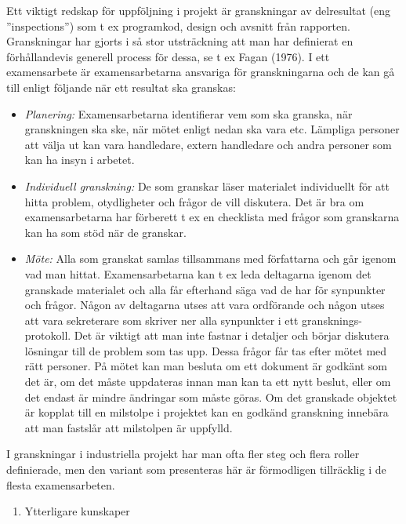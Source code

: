 Ett viktigt redskap för uppföljning i projekt är granskningar av
delresultat (eng ''inspections'') som t ex programkod, design och
avsnitt från rapporten. Granskningar har gjorts i så stor utsträckning
att man har definierat en förhållandevis generell process för dessa, se
t ex Fagan (1976). I ett examensarbete är examensarbetarna ansvariga för
granskningarna och de kan gå till enligt följande när ett resultat ska
granskas:

\begin{itemize}
\item
  \emph{Planering:} Examensarbetarna identifierar vem som ska granska,
  när granskningen ska ske, när mötet enligt nedan ska vara etc.
  Lämpliga personer att välja ut kan vara handledare, extern handledare
  och andra personer som kan ha insyn i arbetet.
\item
  \emph{Individuell granskning:} De som granskar läser materialet
  individuellt för att hitta problem, otydligheter och frågor de vill
  diskutera. Det är bra om examensarbetarna har förberett t ex en
  checklista med frågor som granskarna kan ha som stöd när de granskar.
\item
  \emph{Möte:} Alla som granskat samlas tillsammans med författarna och
  går igenom vad man hittat. Examensarbetarna kan t ex leda deltagarna
  igenom det granskade materialet och alla får efterhand säga vad de har
  för synpunkter och frågor. Någon av deltagarna utses att vara
  ordförande och någon utses att vara sekreterare som skriver ner alla
  synpunkter i ett gransknings-protokoll. Det är viktigt att man inte
  fastnar i detaljer och börjar diskutera lösningar till de problem som
  tas upp. Dessa frågor får tas efter mötet med rätt personer. På mötet
  kan man besluta om ett dokument är godkänt som det är, om det måste
  uppdateras innan man kan ta ett nytt beslut, eller om det endast är
  mindre ändringar som måste göras. Om det granskade objektet är kopplat
  till en milstolpe i projektet kan en godkänd granskning innebära att
  man fastslår att milstolpen är uppfylld.
\end{itemize}

I granskningar i industriella projekt har man ofta fler steg och flera
roller definierade, men den variant som presenteras här är förmodligen
tillräcklig i de flesta examensarbeten.

\begin{enumerate}
\def\labelenumi{\arabic{enumi}.}
\item
  Ytterligare kunskaper
\end{enumerate}

